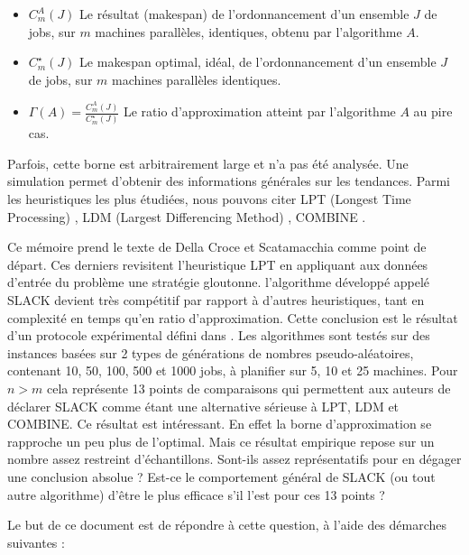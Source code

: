 \documentclass[a4paper,12pt]{report}
\theoremstyle{plain}				%
\theoremstyle{definition}				%
\newcommand\dcs{Della Croce et Scatamacchia\xspace}
\begin{document}
\begin{itemize}
\item $C_m^A(J)$ Le résultat (makespan) de l'ordonnancement
	d'un ensemble $J$ de jobs,
	sur $m$ machines parallèles, identiques,
	obtenu par l'algorithme $A$.
\item $C_m^\star(J)$ Le makespan optimal, idéal, de l'ordonnancement
	d'un ensemble $J$ de jobs,
	sur $m$ machines parallèles identiques.
\item $\Gamma(A)=\frac{C_m^A(J)}{C_m^\star(J)}$
	Le ratio d'approximation atteint par l'algorithme $A$ au pire cas.
\end{itemize}
   
Parfois, cette borne est arbitrairement large et n'a pas été analysée. Une simulation permet d'obtenir des 
  informations générales sur les tendances.
Parmi les heuristiques les plus étudiées, nous pouvons citer 
  LPT (Longest Time Processing) \cite{graham1966bounds}, 
  LDM (Largest Differencing Method) \cite{karmarkar1982differencing}, 
  COMBINE \cite{lee1988multiprocessor}.
  
\bigskip
Ce mémoire prend le texte de \dcs \cite{della2020longest} comme point de départ.    
Ces derniers revisitent l'heuristique LPT en appliquant aux données d'entrée du problème une stratégie gloutonne. 
l'algorithme développé appelé SLACK devient très compétitif par rapport à d'autres heuristiques, 
  tant en complexité en temps qu'en ratio d'approximation. 
Cette conclusion est le résultat d'un protocole expérimental défini dans \cite{iori2008scatter}. 
Les algorithmes sont testés sur des instances basées sur 2 types de générations de nombres pseudo-aléatoires, contenant 10, 50, 100, 500 et 1000 jobs, à planifier sur 5, 10 et 25 machines. 
Pour $n > m$ cela représente 13 points de comparaisons qui permettent aux auteurs de déclarer SLACK comme étant une alternative sérieuse à LPT, LDM et COMBINE. 
Ce résultat est intéressant. En effet la borne d'approximation se rapproche un peu plus de l'optimal. 
Mais ce résultat empirique repose sur un nombre assez restreint d'échantillons. Sont-ils assez représentatifs pour en dégager une conclusion absolue ? Est-ce le comportement général de SLACK (ou tout autre algorithme) d'être le plus efficace s'il l'est pour ces 13 points ? 

Le but de ce document est de répondre à cette question, à l'aide des démarches suivantes :
\end{document}
